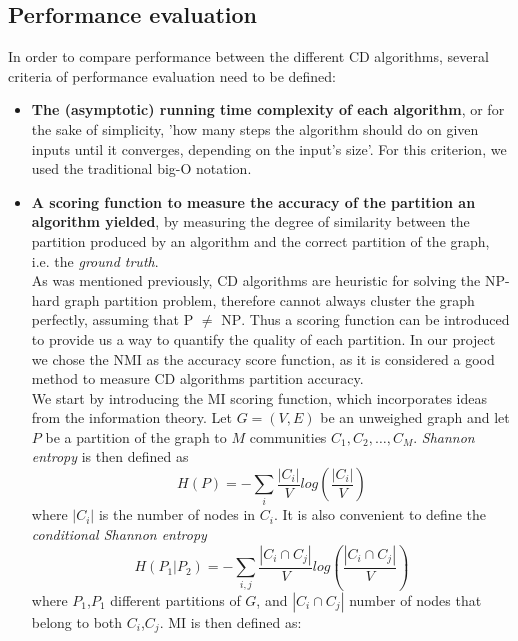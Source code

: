 \subsection{Performance evaluation}
In order to compare performance between the different \acrshort{CD} algorithms, several criteria of performance evaluation need to be defined:
\begin{itemize}

\item \textbf{The (asymptotic) running time complexity of each algorithm}, or for the sake of simplicity, 'how many steps the algorithm should do on given inputs until it converges, depending on the input's size'. For this criterion, we used the traditional big-O notation. 

\item \textbf{A scoring function to measure the accuracy of the partition an algorithm yielded}, by measuring the degree of similarity between the partition produced by an algorithm and the correct partition of the graph, i.e. the \textit{ground truth}.\\
As was mentioned previously, \acrshort{CD} algorithms are heuristic for solving the \textsc{NP}-hard graph partition problem, therefore cannot always cluster the graph perfectly, assuming that \textsc{P} $\neq$ \textsc{NP}. Thus a scoring function can be introduced to provide us a way to quantify the quality of each partition. In our project we chose the \acrfull{NMI} as the accuracy score function, as it is considered a good method to measure \acrshort{CD} algorithms partition accuracy\cite{Danon_2005}.\\
We start by introducing the \acrfull{MI} scoring function, which incorporates ideas from the information theory. 
Let $G=(V,E)$ be an unweighed graph and let $P$ be a partition of the graph to $M$ communities $C_1,C_2,…,C_M$. \textit{Shannon entropy} is then defined as
\begin{equation}
\label{eqn:Shannon}
H(P)= -\sum_{i} \frac{|C_i|}{V}log(\frac{|C_i|}{V})
\end{equation}
where $|C_i|$ is the number of nodes in $C_i$. It is also convenient to define the \textit{conditional Shannon entropy}
\begin{equation}
\label{eqn:cond_Shannon}
H(P_{1}|P_{2})= -\sum_{i,j} \frac{|C_{i}\cap C_{j}|}{V}log(\frac{|C_{i}\cap C_{j}|}{V})
\end{equation}
where $P_1$,$P_1$ different partitions of $G$, and $|C_i \cap C_j|$ number of nodes that belong to both $C_i$,$C_j$. \acrshort{MI} is then defined as:

\end{itemize}
